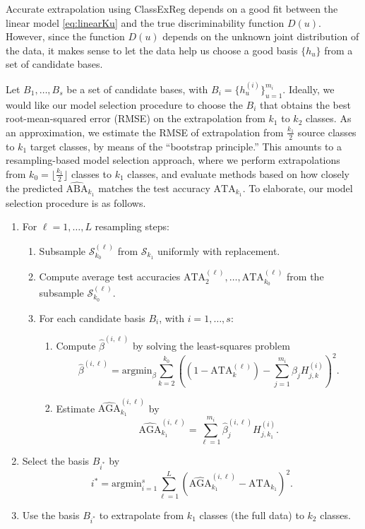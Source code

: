 \documentclass[twoside,11pt]{article}
\newcommand{\argmin}{\text{argmin}}
\begin{document}
Accurate extrapolation using ClassExReg depends on a good
fit between the linear model \eqref{eq:linearKu} and the true
discriminability function $D(u)$.  However, since the function $D(u)$
depends on the unknown joint distribution of the data, it makes sense
to let the data help us choose a good basis $\{h_u\}$ from a set of
candidate bases.

Let $B_1,\hdots, B_s$ be a set of candidate bases, with $B_i = \{h_u^{(i)}\}_{u=1}^{m_i}$.  Ideally, we would like our model selection procedure to choose the $B_i$ that obtains the best root-mean-squared error (RMSE) on the extrapolation from $k_1$ to $k_2$ classes.  As an approximation, we estimate the RMSE of extrapolation from $\frac{k_1}{2}$ source classes to $k_1$ target classes, by means of the ``bootstrap principle.''  This amounts to a resampling-based model selection approach, where we perform extrapolations from $k_0 = \lfloor \frac{k_1}{2} \rfloor$ classes to $k_1$ classes, and evaluate methods based on how closely the predicted $\widehat{\text{ABA}}_{k_1}$ matches the test accuracy $\text{ATA}_{k_1}$.  To elaborate, our model selection procedure is as follows.

\begin{enumerate}
\item For $\ell=1,\hdots,L$ resampling steps:
\begin{enumerate}
\item Subsample $\mathcal{S}_{k_0}^{(\ell)}$ from $\mathcal{S}_{k_1}$ uniformly with replacement.
\item Compute average test accuracies $\text{ATA}_{2}^{(\ell)},\hdots,\text{ATA}_{k_0}^{(\ell)}$ from the subsample $\mathcal{S}_{k_0}^{(\ell)}$.
\item For each candidate basis $B_i$, with $i = 1,\hdots, s$:
\begin{enumerate}
\item Compute $\hat{\beta}^{(i,\ell)}$ by solving the least-squares problem
\[\hat{\beta}^{(i,\ell)} = \argmin_\beta \sum_{k=2}^{k_0} \left( (1 - \text{ATA}_k^{(\ell)}) - \sum_{j=1}^{m_i} \beta_j H_{j, k}^{(i)}\right)^2.\]
\item Estimate $\widehat{\text{AGA}}_{k_1}^{(i,\ell)}$ by
\[
\widehat{\text{AGA}}_{k_1}^{(i,\ell)} = \sum_{\ell=1}^{m_i} \hat{\beta}_j^{(i,\ell)} H_{j, k_1}^{(i)}.
\]
\end{enumerate}
\end{enumerate}
\item Select the basis $B_{i^*}$ by
\[
i^* = \text{argmin}_{i=1}^s \sum_{\ell=1}^L (\widehat{\text{AGA}}_{k_1}^{(i,\ell)} - \text{ATA}_{k_1})^2.
\]
\item Use the basis $B_{i^*}$ to extrapolate from $k_1$ classes (the full data) to $k_2$ classes.
\end{enumerate}
\end{document}
